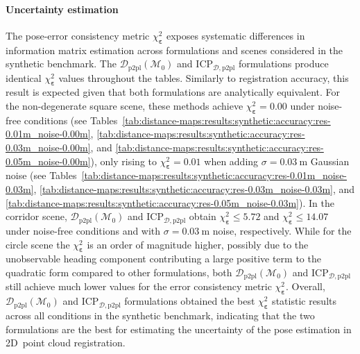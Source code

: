 \paragraph{Uncertainty estimation}
The pose-error consistency metric $\chi_{\boldsymbol{\varepsilon}}^2$ exposes
systematic differences in
information matrix estimation across formulations and scenes considered in
the synthetic benchmark. The $\mathcal{D}_\mathrm{p2pl}(\mathcal{M}_0)$ and
$\mathrm{ICP}_{\mathcal{D},\mathrm{p2pl}}$ formulations produce identical
$\chi_{\boldsymbol{\varepsilon}}^2$ values throughout the tables. Similarly to registration accuracy, this
result is expected given that both formulations are analytically equivalent.
For the non-degenerate square scene, these methods achieve $\chi_{\boldsymbol{\varepsilon}}^2 = 0.00$
under noise-free conditions (see
Tables~\ref{tab:distance-maps:results:synthetic:accuracy:res-0.01m_noise-0.00m},
\ref{tab:distance-maps:results:synthetic:accuracy:res-0.03m_noise-0.00m}, and
\ref{tab:distance-maps:results:synthetic:accuracy:res-0.05m_noise-0.00m}),
only rising to $\chi_{\boldsymbol{\varepsilon}}^2 = 0.01$ when adding $\sigma = \SI{0.03}{\metre}$ Gaussian
noise (see
Tables~\ref{tab:distance-maps:results:synthetic:accuracy:res-0.01m_noise-0.03m},
\ref{tab:distance-maps:results:synthetic:accuracy:res-0.03m_noise-0.03m}, and
\ref{tab:distance-maps:results:synthetic:accuracy:res-0.05m_noise-0.03m}).
In the corridor scene, $\mathcal{D}_\mathrm{p2pl}(\mathcal{M}_0)$ and
$\mathrm{ICP}_{\mathcal{D},\mathrm{p2pl}}$ obtain $\chi_{\boldsymbol{\varepsilon}}^2 \leq 5.72$
and $\chi_{\boldsymbol{\varepsilon}}^2 \leq 14.07$ under noise-free conditions and with
$\sigma = \SI{0.03}{\metre}$ noise, respectively.
While for the circle scene the $\chi_{\boldsymbol{\varepsilon}}^2$ is an order of magnitude higher,
possibly due to the unobservable heading component contributing a large positive
term to the quadratic form compared to other formulations, both
$\mathcal{D}_\mathrm{p2pl}(\mathcal{M}_0)$ and
$\mathrm{ICP}_{\mathcal{D},\mathrm{p2pl}}$ still achieve much lower values for
the error consistency metric $\chi_{\boldsymbol{\varepsilon}}^2$.
Overall, $\mathcal{D}_\mathrm{p2pl}(\mathcal{M}_0)$ and
$\mathrm{ICP}_{\mathcal{D},\mathrm{p2pl}}$ formulations obtained the best
$\chi_{\boldsymbol{\varepsilon}}^2$ statistic results across all conditions in the synthetic benchmark,
indicating that the two formulations are the best for estimating the uncertainty
of the pose estimation in 2D~point cloud registration.

